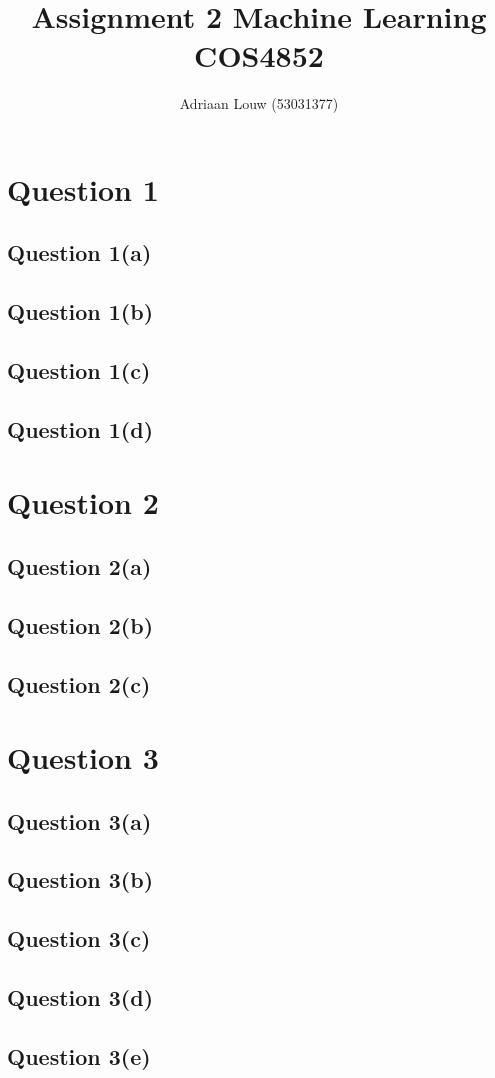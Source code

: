\documentclass[10pt,a4paper]{article}
\title{Assignment 2 Machine Learning COS4852}
\author{ Adriaan Louw (53031377) }
\begin{document}
\maketitle

\tableofcontents

\section{Question 1}
\subsection{Question 1(a)}
\subsection{Question 1(b)}
\subsection{Question 1(c)}
\subsection{Question 1(d)}

\section{Question 2}
\subsection{Question 2(a)}
\subsection{Question 2(b)}
\subsection{Question 2(c)}

\section{Question 3}
\subsection{Question 3(a)}
\subsection{Question 3(b)}
\subsection{Question 3(c)}
\subsection{Question 3(d)}
\subsection{Question 3(e)}


\end{document}
